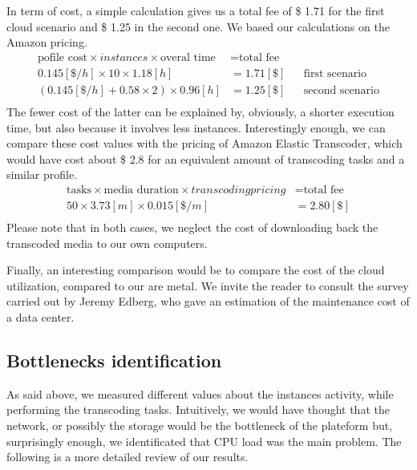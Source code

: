 \documentclass[a4paper, titlepage]{paper}
\numberwithin{figure}{section}
\numberwithin{table}{section}
\begin{document}
      In term of cost, a simple calculation gives us a total fee of \$ 1.71 for the first cloud scenario and \$ 1.25 in the second one. We based our calculations on the Amazon pricing.
      \begin{align*}
        \text{pofile cost} \times {instances} \times \text{overal time} &= \text{total fee} \\
        0.145[\$/h] \times 10         \times 1.18[h] &= 1.71[\$] && \text{first scenario} \\
        (0.145[\$/h] + 0.58 \times 2) \times 0.96[h] &= 1.25[\$] && \text{second scenario}\\
      \end{align*}
      The fewer cost of the latter can be explained by, obviously, a shorter execution time, but also because it involves less instances. Interestingly enough, we can compare these cost values with the pricing of Amazon Elastic Transcoder, which would have cost about \$ 2.8 for an equivalent amount of transcoding tasks and a similar profile.
      \begin{align*}
        \text{tasks} \times \text{media duration} \times {transcoding pricing} &= \text{total fee} \\
        50 \times 3.73[m] \times 0.015[\$/m] &= 2.80[\$] \\
      \end{align*}
      Please note that in both cases, we neglect the cost of downloading back the transcoded media to our own computers.

      Finally, an interesting comparison would be to compare the cost of the cloud utilization, compared to our are metal. We invite the reader to consult the survey carried out by Jeremy Edberg, who gave an estimation of the maintenance cost of a data center.

    \subsection{Bottlenecks identification}
      As said above, we measured different values about the instances activity, while performing the transcoding tasks. Intuitively, we would have thought that the network, or possibly the storage would be the bottleneck of the plateform but, surprisingly enough, we identificated that CPU load was the main problem. The following is a more detailed review of our results.
\end{document}
